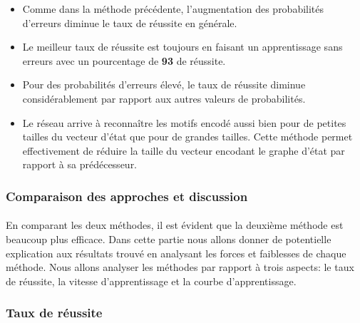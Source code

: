 \begin{itemize}
	\item Comme dans la méthode précédente, l'augmentation des probabilités d'erreurs diminue le taux de réussite en générale.
	\item Le meilleur taux de réussite est toujours en faisant un apprentissage sans erreurs avec un pourcentage de \textbf{93} de réussite.
	\item Pour des probabilités d'erreurs élevé, le taux de réussite diminue considérablement par rapport aux autres valeurs de probabilités.
	\item Le réseau arrive à reconnaître les motifs encodé aussi bien pour de petites tailles du vecteur d'état que pour de grandes tailles. Cette méthode permet effectivement de réduire la taille du vecteur encodant le graphe d'état par rapport à sa prédécesseur.	
\end{itemize}

\subsubsection{Comparaison des approches et discussion}
\paragraph{}En comparant les deux méthodes, il est évident que la deuxième méthode est beaucoup plus efficace. Dans cette partie nous allons donner de potentielle explication aux résultats trouvé en analysant les forces et faiblesses de chaque méthode. Nous allons analyser les méthodes par rapport à trois aspects: le taux de réussite, la vitesse d'apprentissage et la courbe d'apprentissage.
\subsubsection{Taux de réussite}\label{success_rate}
